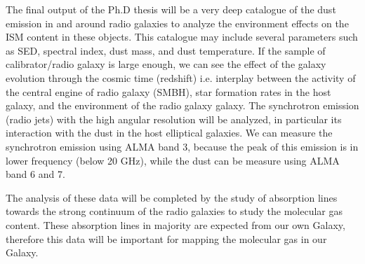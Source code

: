 The final output of the Ph.D thesis will be a very deep catalogue of the dust emission in and around radio galaxies to analyze the environment effects on the ISM content in these objects. This catalogue may include several parameters such as SED, spectral index, dust mass, and dust temperature. If the sample of calibrator/radio galaxy is large enough, we can see the effect of the galaxy evolution through the cosmic time (redshift) i.e. interplay between the activity of the central engine of radio galaxy (SMBH), star formation rates in the host galaxy, and the environment of the radio galaxy galaxy. The synchrotron emission (radio jets) with the high angular resolution will be analyzed, in particular its interaction with the dust in the host elliptical galaxies. We can measure the synchrotron emission using ALMA band 3, because the peak of this emission is in lower frequency (below 20 GHz), while the dust can be measure using ALMA band 6 and 7. 

The analysis of these data will be completed by the study of absorption lines towards the strong continuum of the radio galaxies to study the molecular gas content. These absorption lines in majority are expected from our own Galaxy, therefore this data will be important for mapping the molecular gas in our Galaxy.


\cleardoublepage
